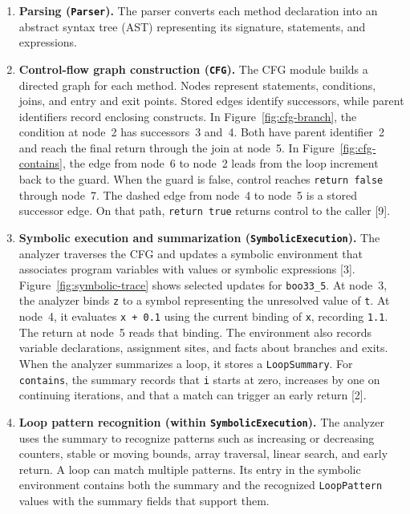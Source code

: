 \documentclass[11pt,a4paper]{article}
\begin{document}
\begin{enumerate}
\item \textbf{Parsing (\texttt{Parser}).} The parser converts each method declaration into an abstract syntax tree (AST) representing its signature, statements, and expressions.

\item \textbf{Control-flow graph construction (\texttt{CFG}).} The CFG module builds a directed graph for each method. Nodes represent statements, conditions, joins, and entry and exit points. Stored edges identify successors, while parent identifiers record enclosing constructs. In Figure~\ref{fig:cfg-branch}, the condition at node~2 has successors~3 and~4. Both have parent identifier~2 and reach the final return through the join at node~5. In Figure~\ref{fig:cfg-contains}, the edge from node~6 to node~2 leads from the loop increment back to the guard. When the guard is false, control reaches \texttt{return false} through node~7. The dashed edge from node~4 to node~5 is a stored successor edge. On that path, \texttt{return true} returns control to the caller [9].

\item \textbf{Symbolic execution and summarization (\texttt{SymbolicExecution}).} The analyzer traverses the CFG and updates a symbolic environment that associates program variables with values or symbolic expressions [3]. Figure~\ref{fig:symbolic-trace} shows selected updates for \texttt{boo33\_5}. At node~3, the analyzer binds \texttt{z} to a symbol representing the unresolved value of \texttt{t}. At node~4, it evaluates \texttt{x + 0.1} using the current binding of \texttt{x}, recording \texttt{1.1}. The return at node~5 reads that binding. The environment also records variable declarations, assignment sites, and facts about branches and exits. When the analyzer summarizes a loop, it stores a \texttt{LoopSummary}. For \texttt{contains}, the summary records that \texttt{i} starts at zero, increases by one on continuing iterations, and that a match can trigger an early return [2].

\item \textbf{Loop pattern recognition (within \texttt{SymbolicExecution}).} The analyzer uses the summary to recognize patterns such as increasing or decreasing counters, stable or moving bounds, array traversal, linear search, and early return. A loop can match multiple patterns. Its entry in the symbolic environment contains both the summary and the recognized \texttt{LoopPattern} values with the summary fields that support them.


\end{enumerate}
\end{document}

